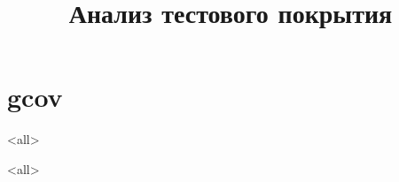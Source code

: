 

\title[Profiling]{Анализ тестового покрытия}





\begin{frame}
	\frametitle{}
	\titlepage
	\vspace{-0.5cm}
	\begin{center}
	\end{center}
\end{frame}

\begin{frame}
	\tableofcontents
\end{frame}




\section{gcov}
\mode<all>{}

\mode<all>

